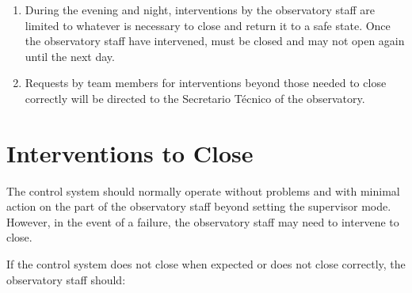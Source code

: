 \begin{enumerate}
\begin{enumerate}
\item
When the control system closes (at the end of the night, in response to weather conditions, or if the supervisor is forced to close), it switches the lights on for safety. At the end of the process, if the control system can determine that the enclosure closed correctly, it will switch the lights off. If it cannot, it will leave the lights switched on. Thus, if the lights are left on, this indicates that there was a problem during closing and the observatory staff should intervene as described in \S\ref{section:operations:interventions}.

\item
The observatory staff should report explicit changes to the supervisor state (e.g., use of the “Enable” and “Close” buttons) and any other relevant information in the Skype chat.
\end{enumerate}

As their other duties permit, the observatory staff are encouraged to report other conditions or occurrences that might degrade the ability of the telescope to observe (e.g., failures of the control system or failures to focus) in the Skype chat.

\item
During the evening and night, interventions by the observatory staff are limited to whatever is necessary to close {\projectname} and return it to a safe state. Once the observatory staff have intervened, {\projectname} must be closed and may not open again until the next day.

\item
Requests by team members for interventions beyond those needed to close {\projectname} correctly will be directed to the Secretario Técnico of the observatory.
\end{enumerate}

\section{Interventions to Close}
\label{section:operations:interventions}

The control system should normally operate without problems and with minimal action on the part of the observatory staff beyond setting the supervisor mode. However, in the event of a failure, the observatory staff may need to intervene to close.

If the control system does not close when expected or does not close correctly, the observatory staff should:

